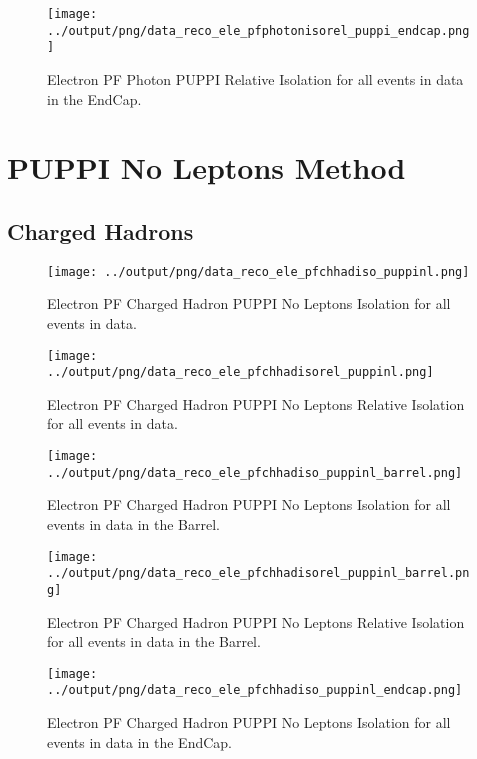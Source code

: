 \documentclass[11pt]{book}
\begin{document}
\begin{figure}[htb]
\centering
\texttt{[image: ../output/png/data\_reco\_ele\_pfphotonisorel\_puppi\_endcap.png]}
\caption{Electron PF Photon PUPPI Relative Isolation for all events in data in the EndCap.}
\label{fig:data_ele_pfphotonisorel_puppi_endcap}
\end{figure}
\clearpage

\section{PUPPI No Leptons Method}
\subsection{Charged Hadrons}
\begin{figure}[htb]
\centering
\texttt{[image: ../output/png/data\_reco\_ele\_pfchhadiso\_puppinl.png]}
\caption{Electron PF Charged Hadron PUPPI No Leptons Isolation for all events in data.}
\label{fig:data_ele_pfchhadiso_puppinl}
\end{figure}

\begin{figure}[htb]
\centering
\texttt{[image: ../output/png/data\_reco\_ele\_pfchhadisorel\_puppinl.png]}
\caption{Electron PF Charged Hadron PUPPI No Leptons Relative Isolation for all events in data.}
\label{fig:data_ele_pfchhadisorel_puppinl}
\end{figure}

\begin{figure}[htb]
\centering
\texttt{[image: ../output/png/data\_reco\_ele\_pfchhadiso\_puppinl\_barrel.png]}
\caption{Electron PF Charged Hadron PUPPI No Leptons Isolation for all events in data in the Barrel.}
\label{fig:data_ele_pfchhadiso_puppinl_barrel}
\end{figure}

\begin{figure}[htb]
\centering
\texttt{[image: ../output/png/data\_reco\_ele\_pfchhadisorel\_puppinl\_barrel.png]}
\caption{Electron PF Charged Hadron PUPPI No Leptons Relative Isolation for all events in data in the Barrel.}
\label{fig:data_ele_pfchhadisorel_puppinl_barrel}
\end{figure}

\begin{figure}[htb]
\centering
\texttt{[image: ../output/png/data\_reco\_ele\_pfchhadiso\_puppinl\_endcap.png]}
\caption{Electron PF Charged Hadron PUPPI No Leptons Isolation for all events in data in the EndCap.}
\label{fig:data_ele_pfchhadiso_puppinl_endcap}
\end{figure}
\end{document}
